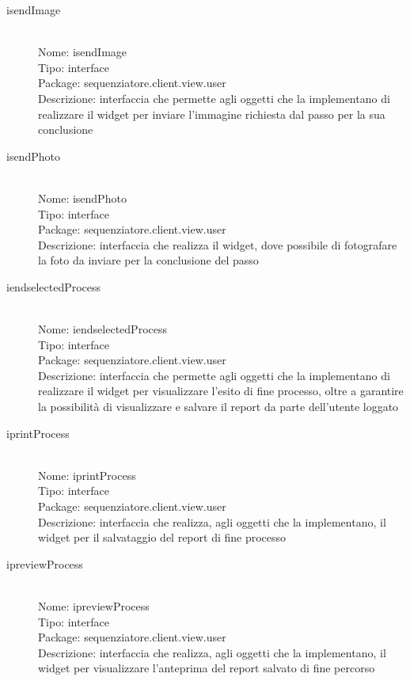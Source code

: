 \begin{description}
	\item[isendImage] 
  	\hfill \\
  	Nome: isendImage\\
  	Tipo: interface\\
	Package: sequenziatore.client.view.user\\
	Descrizione: interfaccia che permette agli oggetti che la implementano di realizzare il widget per inviare l'immagine richiesta dal passo per la sua conclusione
\end{description}

\begin{description}
	\item[isendPhoto] 
  	\hfill \\
  	Nome: isendPhoto\\
  	Tipo: interface\\
	Package: sequenziatore.client.view.user\\
	Descrizione: interfaccia che realizza il widget, dove possibile di fotografare la foto da inviare per la conclusione del passo
\end{description}

\begin{description}
	\item[iendselectedProcess] 
  	\hfill \\
  	Nome: iendselectedProcess\\
  	Tipo: interface\\
	Package: sequenziatore.client.view.user\\
	Descrizione: interfaccia che permette agli oggetti che la implementano di realizzare il widget per visualizzare l'esito di fine processo, oltre a garantire la possibilità di visualizzare e salvare il report da parte dell'utente loggato
\end{description}

\begin{description}
	\item[iprintProcess] 
  	\hfill \\
  	Nome: iprintProcess\\
  	Tipo: interface\\
	Package: sequenziatore.client.view.user\\
	Descrizione: interfaccia che realizza, agli oggetti che la implementano,  il widget per il salvataggio del report di fine processo
\end{description}

\begin{description}
	\item[ipreviewProcess] 
  	\hfill \\
  	Nome: ipreviewProcess\\
  	Tipo: interface\\
	Package: sequenziatore.client.view.user\\
	Descrizione: interfaccia che realizza, agli oggetti che la implementano,  il widget per visualizzare l'anteprima del report salvato di fine percorso
\end{description}
